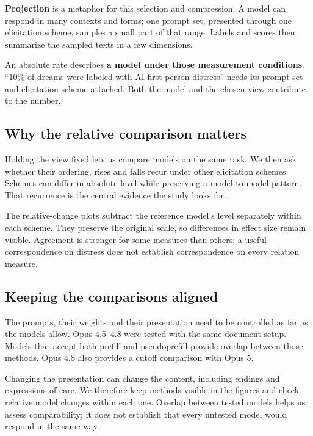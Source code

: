 \documentclass[
  10pt,
]{article}
\begin{document}
\textbf{Projection} is a metaphor for this selection and compression. A model can respond in many contexts and forms; one prompt set, presented through one elicitation scheme, samples a small part of that range. Labels and scores then summarize the sampled texts in a few dimensions.

An absolute rate describes \textbf{a model under those measurement conditions}. ``10\% of dreams were labeled with AI first-person distress'' needs its prompt set and elicitation scheme attached. Both the model and the chosen view contribute to the number.

\subsection{Why the relative comparison matters}\label{why-the-relative-comparison-matters}

Holding the view fixed lets us compare models on the same task. We then ask whether their ordering, rises and falls recur under other elicitation schemes. Schemes can differ in absolute level while preserving a model-to-model pattern. That recurrence is the central evidence the study looks for.

The relative-change plots subtract the reference model's level separately within each scheme. They preserve the original scale, so differences in effect size remain visible. Agreement is stronger for some measures than others; a useful correspondence on distress does not establish correspondence on every relation measure.

\subsection{Keeping the comparisons aligned}\label{keeping-the-comparisons-aligned}

The prompts, their weights and their presentation need to be controlled as far as the models allow. Opus 4.5--4.8 were tested with the same document setup. Models that accept both prefill and pseudoprefill provide overlap between those methods. Opus 4.8 also provides a cutoff comparison with Opus 5.

Changing the presentation can change the content, including endings and expressions of care. We therefore keep methods visible in the figures and check relative model changes within each one. Overlap between tested models helps us assess comparability; it does not establish that every untested model would respond in the same way.
\end{document}
